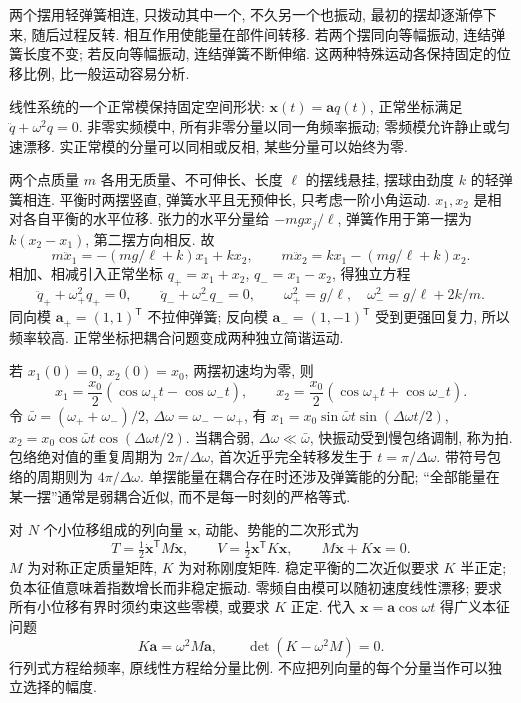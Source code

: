 \label{ch:modes}
两个摆用轻弹簧相连, 只拨动其中一个, 不久另一个也振动, 最初的摆却逐渐停下来, 随后过程反转. 相互作用使能量在部件间转移. 若两个摆同向等幅振动, 连结弹簧长度不变; 若反向等幅振动, 连结弹簧不断伸缩. 这两种特殊运动各保持固定的位移比例, 比一般运动容易分析.

\begin{definition}
线性系统的一个正常模保持固定空间形状: $\boldsymbol x(t)=\boldsymbol a q(t)$, 正常坐标满足 $\ddot q+\omega^2q=0$. 非零实频模中, 所有非零分量以同一角频率振动; 零频模允许静止或匀速漂移. 实正常模的分量可以同相或反相, 某些分量可以始终为零.
\end{definition}
两个点质量 $m$ 各用无质量、不可伸长、长度 $\ell$ 的摆线悬挂, 摆球由劲度 $k$ 的轻弹簧相连. 平衡时两摆竖直, 弹簧水平且无预伸长, 只考虑一阶小角运动. $x_1,x_2$ 是相对各自平衡的水平位移. 张力的水平分量给 $-mgx_j/\ell$, 弹簧作用于第一摆为 $k(x_2-x_1)$, 第二摆方向相反. 故
\[
m\ddot x_1=-(mg/\ell+k)x_1+kx_2,\qquad
m\ddot x_2=kx_1-(mg/\ell+k)x_2.
\]
相加、相减引入正常坐标 $q_+=x_1+x_2$, $q_-=x_1-x_2$, 得独立方程
\[
\ddot q_++\omega_+^2q_+=0,\qquad
\ddot q_-+\omega_-^2q_-=0,\qquad
\omega_+^2=g/\ell,\quad\omega_-^2=g/\ell+2k/m.
\]
同向模 $\boldsymbol a_+=(1,1)^{\mathsf T}$ 不拉伸弹簧; 反向模 $\boldsymbol a_-=(1,-1)^{\mathsf T}$ 受到更强回复力, 所以频率较高. 正常坐标把耦合问题变成两种独立简谐运动.

若 $x_1(0)=0$, $x_2(0)=x_0$, 两摆初速均为零, 则
\[
x_1=\frac{x_0}{2}(\cos\omega_+t-\cos\omega_-t),\qquad
x_2=\frac{x_0}{2}(\cos\omega_+t+\cos\omega_-t).
\]
令 $\bar\omega=(\omega_++\omega_-)/2$, $\Delta\omega=\omega_--\omega_+$, 有 $x_1=x_0\sin\bar\omega t\sin(\Delta\omega t/2)$, $x_2=x_0\cos\bar\omega t\cos(\Delta\omega t/2)$. 当耦合弱, $\Delta\omega\ll\bar\omega$, 快振动受到慢包络调制, 称为拍. 包络绝对值的重复周期为 $2\pi/\Delta\omega$, 首次近乎完全转移发生于 $t=\pi/\Delta\omega$. 带符号包络的周期则为 $4\pi/\Delta\omega$. 单摆能量在耦合存在时还涉及弹簧能的分配; “全部能量在某一摆”通常是弱耦合近似, 而不是每一时刻的严格等式.

对 $N$ 个小位移组成的列向量 $\boldsymbol x$, 动能、势能的二次形式为
\[
T=\tfrac12\dot{\boldsymbol x}^{\mathsf T}M\dot{\boldsymbol x},\qquad
V=\tfrac12\boldsymbol x^{\mathsf T}K\boldsymbol x,
\qquad M\ddot{\boldsymbol x}+K\boldsymbol x=0.
\]
$M$ 为对称正定质量矩阵, $K$ 为对称刚度矩阵. 稳定平衡的二次近似要求 $K$ 半正定; 负本征值意味着指数增长而非稳定振动. 零频自由模可以随初速度线性漂移; 要求所有小位移有界时须约束这些零模, 或要求 $K$ 正定. 代入 $\boldsymbol x=\boldsymbol a\cos\omega t$ 得广义本征问题
\begin{equation}\label{eq:generalized}
K\boldsymbol a=\omega^2M\boldsymbol a,\qquad
\det(K-\omega^2M)=0.
\end{equation}
行列式方程给频率, 原线性方程给分量比例. 不应把列向量的每个分量当作可以独立选择的幅度.

